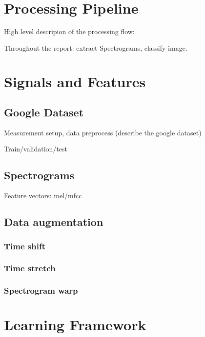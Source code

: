 
\section{Processing Pipeline}
\label{sec:processing_architecture}

High level descripion of the processing flow:

Throughout the report: extract Spectrograms, classify image.

\section{Signals and Features}
\label{sec:model}

\subsection{Google Dataset}

Measurement setup, data preprocess (describe the google dataset)

Train/validation/test

\subsection{Spectrograms}

Feature vectors: mel/mfcc

\subsection{Data augmentation}

\subsubsection{Time shift}

\subsubsection{Time stretch}

\subsubsection{Spectrogram warp}

\section{Learning Framework}
\label{sec:learning_framework}

